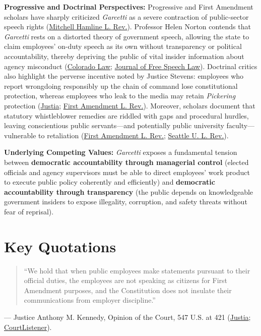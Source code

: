 \documentclass[12pt]{article}
\begin{document}
\textbf{Progressive and Doctrinal Perspectives:} Progressive and First Amendment scholars have sharply criticized \textit{Garcetti} as a severe contraction of public-sector speech rights (\href{https://open.mitchellhamline.edu/cgi/viewcontent.cgi?article=1237&context=mhlr}{Mitchell Hamline L. Rev.}). Professor Helen Norton contends that \textit{Garcetti} rests on a distorted theory of government speech, allowing the state to claim employees' on-duty speech as its own without transparency or political accountability, thereby depriving the public of vital insider information about agency misconduct (\href{https://scholar.law.colorado.edu/context/faculty-articles/article/1915/viewcontent/2008_Norton_Government_Workers_and_Government_Speech.pdf}{Colorado Law}; \href{https://www.journaloffreespeechlaw.org/kozel.pdf}{Journal of Free Speech Law}). Doctrinal critics also highlight the perverse incentive noted by Justice Stevens: employees who report wrongdoing responsibly up the chain of command lose constitutional protection, whereas employees who leak to the media may retain \textit{Pickering} protection (\href{https://supreme.justia.com/cases/federal/us/547/410/}{Justia}; \href{https://scholarship.law.unc.edu/cgi/viewcontent.cgi?article=1087&context=falr}{First Amendment L. Rev.}). Moreover, scholars document that statutory whistleblower remedies are riddled with gaps and procedural hurdles, leaving conscientious public servants---and potentially public university faculty---vulnerable to retaliation (\href{https://scholarship.law.unc.edu/cgi/viewcontent.cgi?article=1087&context=falr}{First Amendment L. Rev.}; \href{https://digitalcommons.law.seattleu.edu/cgi/viewcontent.cgi?article=2199&context=sulr}{Seattle U. L. Rev.}).

\textbf{Underlying Competing Values:} \textit{Garcetti} exposes a fundamental tension between \textbf{democratic accountability through managerial control} (elected officials and agency supervisors must be able to direct employees' work product to execute public policy coherently and efficiently) and \textbf{democratic accountability through transparency} (the public depends on knowledgeable government insiders to expose illegality, corruption, and safety threats without fear of reprisal).

\section{Key Quotations}

\begin{quote}
``We hold that when public employees make statements pursuant to their official duties, the employees are not speaking as citizens for First Amendment purposes, and the Constitution does not insulate their communications from employer discipline.''
\end{quote}
\noindent --- Justice Anthony M. Kennedy, Opinion of the Court, 547 U.S. at 421 (\href{https://supreme.justia.com/cases/federal/us/547/410/}{Justia}; \href{https://www.courtlistener.com/opinion/145653/garcetti-v-ceballos/}{CourtListener}).
\end{document}
